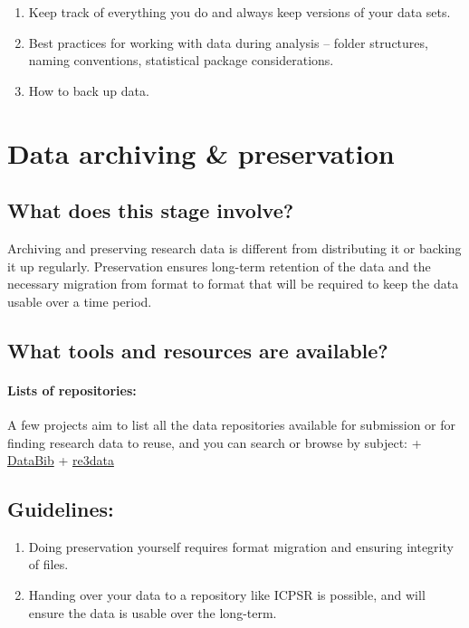 \documentclass[]{article}
\begin{document}
\begin{enumerate}
\def\labelenumi{\arabic{enumi}.}
\itemsep1pt\parskip0pt
\item
  Keep track of everything you do and always keep versions of your data
  sets.
\item
  Best practices for working with data during analysis -- folder
  structures, naming conventions, statistical package considerations.
\item
  How to back up data.
\end{enumerate}

\section{Data archiving \&
preservation}\label{data-archiving-preservation}

\subsection{What does this stage
involve?}\label{what-does-this-stage-involve}

Archiving and preserving research data is different from distributing it
or backing it up regularly. Preservation ensures long-term retention of
the data and the necessary migration from format to format that will be
required to keep the data usable over a time period.

\subsection{What tools and resources are
available?}\label{what-tools-and-resources-are-available-2}

\paragraph{Lists of repositories:}\label{lists-of-repositories}

A few projects aim to list all the data repositories available for
submission or for finding research data to reuse, and you can search or
browse by subject: + \href{http://databib.org/}{DataBib} +
\href{http://www.re3data.org}{re3data}

\subsection{Guidelines:}\label{guidelines-2}

\begin{enumerate}
\def\labelenumi{\arabic{enumi}.}
\itemsep1pt\parskip0pt
\item
  Doing preservation yourself requires format migration and ensuring
  integrity of files.
\item
  Handing over your data to a repository like ICPSR is possible, and
  will ensure the data is usable over the long-term.
\end{enumerate}
\end{document}
